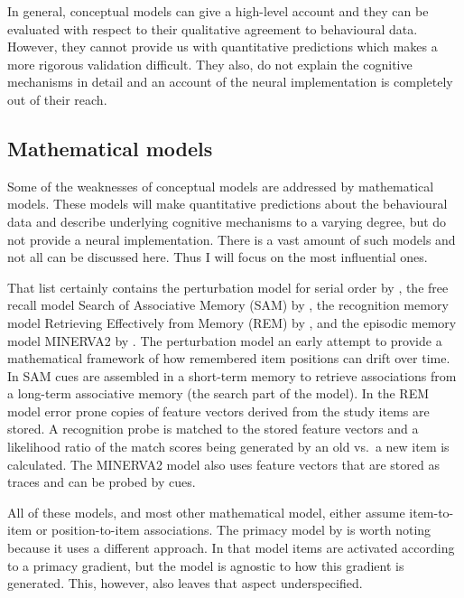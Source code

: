 In general, conceptual models can give a high-level account and they can be evaluated with respect to their qualitative agreement to behavioural data.
However, they cannot provide us with quantitative predictions which makes a more rigorous validation difficult.
They also, do not explain the cognitive mechanisms in detail and an account of the neural implementation is completely out of their reach.


\subsection{Mathematical models}
Some of the weaknesses of conceptual models are addressed by mathematical models.
These models will make quantitative predictions about the behavioural data and describe underlying cognitive mechanisms to a varying degree, but do not provide a neural implementation.
There is a vast amount of such models and not all can be discussed here.
Thus I will focus on the most influential ones.

That list certainly contains the perturbation model for serial order by \textcite{Estes1972}, the free recall model Search of Associative Memory (SAM) by \textcite{Raaijmakers1981}, the recognition memory model Retrieving Effectively from Memory (REM) by \textcite{Shiffrin1997}, and the episodic memory model MINERVA2 by \textcite{Hintzman1988}.
The perturbation model an early attempt to provide a mathematical framework of how remembered item positions can drift over time.
In SAM cues are assembled in a short-term memory to retrieve associations from a long-term associative memory (the search part of the model).
In the REM model error prone copies of feature vectors derived from the study items are stored.
A recognition probe is matched to the stored feature vectors and a likelihood ratio of the match scores being generated by an old vs.\ a new item is calculated.
The MINERVA2 model also uses feature vectors that are stored as traces and can be probed by cues.

All of these models, and most other mathematical model, either assume item-to-item or position-to-item associations.
The primacy model by \textcite{Page1998} is worth noting because it uses a different approach.
In that model items are activated according to a primacy gradient, but the model is agnostic to how this gradient is generated.
This, however, also leaves that aspect underspecified.

